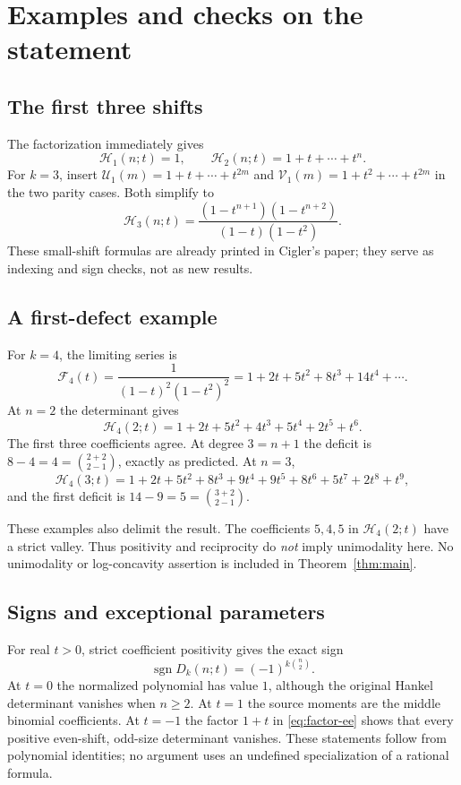 \documentclass[11pt]{article}
\theoremstyle{definition}
\theoremstyle{remark}
\newcommand{\U}{\mathcal U}
\newcommand{\V}{\mathcal V}
\newcommand{\Ht}{\mathcal H}
\newcommand{\F}{\mathcal F}
\DeclareMathOperator{\sgn}{sgn}
\numberwithin{equation}{section}
\begin{document}
\section{Examples and checks on the statement}
\label{sec:examples}

\subsection{The first three shifts}
The factorization immediately gives
\begin{equation}
 \Ht_1(n;t)=1,\qquad
 \Ht_2(n;t)=1+t+\cdots+t^n.
 \label{eq:k12}
\end{equation}
For $k=3$, insert
$\U_1(m)=1+t+\cdots+t^{2m}$ and
$\V_1(m)=1+t^2+\cdots+t^{2m}$ in the two parity cases. Both simplify to
\begin{equation}
 \Ht_3(n;t)=\frac{(1-t^{n+1})(1-t^{n+2})}{(1-t)(1-t^2)}.
 \label{eq:k3}
\end{equation}
These small-shift formulas are already printed in Cigler's paper; they
serve as indexing and sign checks, not as new results.

\subsection{A first-defect example}
For $k=4$, the limiting series is
\[
 \F_4(t)=\frac1{(1-t)^2(1-t^2)^2}
 =1+2t+5t^2+8t^3+14t^4+\cdots.
\]
At $n=2$ the determinant gives
\[
 \Ht_4(2;t)=1+2t+5t^2+4t^3+5t^4+2t^5+t^6.
\]
The first three coefficients agree. At degree $3=n+1$ the deficit is
$8-4=4=\binom{2+2}{2-1}$, exactly as predicted.
At $n=3$,
\[
 \Ht_4(3;t)=1+2t+5t^2+8t^3+9t^4+9t^5+8t^6+5t^7+2t^8+t^9,
\]
and the first deficit is $14-9=5=\binom{3+2}{2-1}$.

These examples also delimit the result. The coefficients $5,4,5$ in
$\Ht_4(2;t)$ have a strict valley. Thus positivity and reciprocity do
\emph{not} imply unimodality here. No unimodality or log-concavity assertion
is included in Theorem~\ref{thm:main}.

\subsection{Signs and exceptional parameters}
For real $t>0$, strict coefficient positivity gives the exact sign
\begin{equation}
 \sgn D_k(n;t)=(-1)^{k\binom n2}.
 \label{eq:sign}
\end{equation}
At $t=0$ the normalized polynomial has value $1$, although the original
Hankel determinant vanishes when $n\ge2$. At $t=1$ the source moments
are the middle binomial coefficients. At $t=-1$ the factor $1+t$ in
\eqref{eq:factor-ee} shows that every positive even-shift, odd-size determinant
vanishes. These statements follow from polynomial identities; no argument
uses an undefined specialization of a rational formula.
\end{document}
